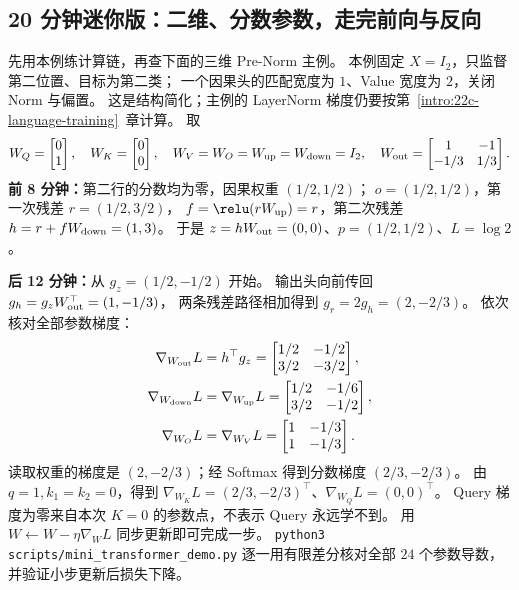 \subsection{20 分钟迷你版：二维、分数参数，走完前向与反向}
\label{app:rational-mini}
先用本例练计算链，再查下面的三维 Pre-Norm 主例。
本例固定 $X=I_2$，只监督第二位置、目标为第二类；
一个因果头的匹配宽度为 $1$、Value 宽度为 $2$，关闭 Norm 与偏置。
这是结构简化；主例的 LayerNorm 梯度仍要按第~\ref*{intro:22c-language-training}~章计算。
取
\[
W_Q=\begin{bmatrix}0\\1\end{bmatrix},\quad W_K=\begin{bmatrix}0\\0\end{bmatrix},\quad
W_V=W_O=W_{\rm up}=W_{\rm down}=I_2,\quad
W_{\rm out}=\begin{bmatrix}1&-1\\-1/3&1/3\end{bmatrix}.
\]
\textbf{前 8 分钟：}第二行的分数均为零，因果权重 $(1/2,1/2)$；
$o=(1/2,1/2)$，第一次残差 $r=(1/2,3/2)$，
$f=\relu(rW_{\rm up})=r$，第二次残差 $h=r+fW_{\rm down}=(1,3)$。
于是 $z=hW_{\rm out}=(0,0)$、$p=(1/2,1/2)$、$L=\log2$。

\textbf{后 12 分钟：}从 $g_z=(1/2,-1/2)$ 开始。
输出头向前传回 $g_h=g_zW_{\rm out}^{\top}=(1,-1/3)$，
两条残差路径相加得到 $g_r=2g_h=(2,-2/3)$。
依次核对全部参数梯度：
\[
\begin{aligned}
\nabla_{W_{\rm out}}L&=h^\top g_z=\begin{bmatrix}1/2&-1/2\\3/2&-3/2\end{bmatrix},\\
\nabla_{W_{\rm down}}L&=\nabla_{W_{\rm up}}L
=\begin{bmatrix}1/2&-1/6\\3/2&-1/2\end{bmatrix},\\
\nabla_{W_O}L&=\nabla_{W_V}L
=\begin{bmatrix}1&-1/3\\1&-1/3\end{bmatrix}.
\end{aligned}
\]
读取权重的梯度是 $(2,-2/3)$；经 Softmax 得到分数梯度 $(2/3,-2/3)$。
由 $q=1,k_1=k_2=0$，得到
$\nabla_{W_K}L=(2/3,-2/3)^\top$、$\nabla_{W_Q}L=(0,0)^\top$。
Query 梯度为零来自本次 $K=0$ 的参数点，不表示 Query 永远学不到。
用 $W\leftarrow W-\eta\nabla_WL$ 同步更新即可完成一步。
\texttt{python3 scripts/mini\_transformer\_demo.py} 逐一用有限差分核对全部 $24$ 个参数导数，并验证小步更新后损失下降。
\medskip

